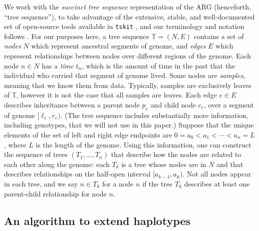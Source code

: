 \documentclass[10pt,twoside,lineno]{gsajnl}
\newcommand{\T}{\mathbb{T}}
\newcommand{\tskit}{\texttt{tskit}}
\begin{document}
We work with the \emph{succinct tree sequence} representation of the ARG (henceforth, ``tree sequence''),
to take advantage of the extensive, stable, and well-documented set of open-source tools
available in \tskit{} \citep{tskit}, 
and our terminology and notation follows \citet{ralph2020efficiently}.
For our purposes here,
a tree sequence $\T = (N, E)$ contains a set of \emph{nodes} $N$ 
which represent ancestral segments of genome,
and \emph{edges} $E$ which represent relationships between nodes over different regions of the genome.
Each node $n \in N$ has a \emph{time} $t_n$,
which is the amount of time in the past that the individual who carried that segment of genome lived.
Some nodes are \emph{samples}, meaning that we know them from data. 
Typically, samples are exclusively leaves of $\T$, however it is not the case that all samples are leaves.
Each edge $e \in E$ describes inheritance between a parent node $p_e$ and child node $c_e$,
over a segment of genome $[\ell_e, r_e)$.
(The tree sequence includes substantially more information, including genotypes, that we will not use in this paper.)
Suppose that the unique elements of the set of left and right edge endpoints
are $0 = a_0 < a_1 < \cdots < a_{n} = L$, where $L$ is the length of the genome.
Using this information, one can construct the sequence of 
trees $\left(T_1,...,T_{n}\right)$ that describe how the nodes are related to each other along the genome:
each $T_k$ is a tree whose nodes are in $N$
and that describes relationships on the half-open interval $[a_{k-1}, a_k)$.
Not all nodes appear in each tree,
and we say $n \in T_k$ for a node $n$ if the tree $T_k$ describes at least one parent-child relationship
for node $n$.

\subsection{An algorithm to extend haplotypes}
\end{document}
